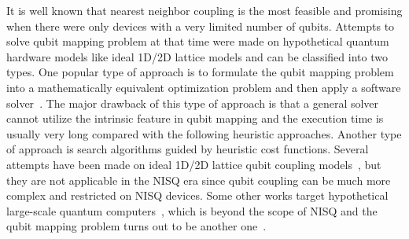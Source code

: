 \documentclass[journal,10pt,twocolumn]{IEEEtran}
\begin{document}
It is well known that nearest neighbor coupling is the most feasible and promising when there were only devices with a very limited number of qubits.
Attempts to solve qubit mapping problem at that time were made on hypothetical quantum hardware models like ideal 1D/2D lattice models and can be classified into two types.
One popular type of approach is to formulate the qubit mapping problem into a mathematically equivalent optimization problem and then apply a software solver~\cite{maslov2008quantum,chakrabarti2011linear,shafaei2013optimization,shafaei2014qubit,wille2014optimal,lye2015determining,venturelli2017temporal,venturelli2018compiling,booth2018comparing,oddi2018greedy,bhattacharjee2017depth}.
The major drawback of this type of approach is that a general solver cannot utilize the intrinsic feature in qubit mapping and the execution time is usually very long compared with the following heuristic approaches.
Another type of approach is search algorithms guided by heuristic cost functions.
Several attempts have been made on ideal 1D/2D lattice qubit coupling models~\cite{alfailakawi2014lnn,saeedi2011synthesis,lin2015paqcs,wille2016look,shrivastwa2015fast,kole2016heuristic,kole2018new,bhattacharjee2018novel}, but they are not applicable in the NISQ era since qubit coupling can be much more complex and restricted on NISQ devices.
Some other works target hypothetical large-scale quantum computers~\cite{heckey2015compiler,javadi2017optimized}, which is beyond the scope of NISQ and the qubit mapping problem turns out to be another one~\cite{heckey2015compiler,paler2017fault,javadi2017optimized,lao2018mapping}.
\end{document}
